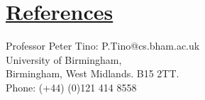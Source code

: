 \documentclass[11pt]{article}
\begin{document}
	\vspace{-20pt}
	\hspace{-100pt}\section*{\underline{References}}	
				Professor Peter Tino:  P.Tino@cs.bham.ac.uk  \\
				University of Birmingham,\\
				Birmingham, 
				West Midlands.
				B15 2TT.\\
				Phone: (+44) (0)121 414 8558\\
				
\end{document}

